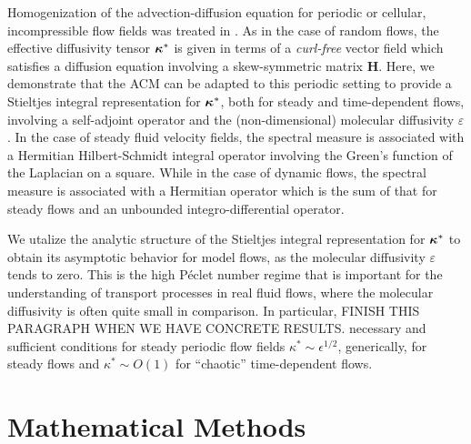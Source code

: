 \documentclass[11pt]{amsart}
\newcommand{\Hb}{\mathbf{H}}
\newcommand\bkappa{\mbox{\boldmath${\kappa}$}}
\begin{document}
Homogenization of the advection-diffusion equation for periodic or
cellular, incompressible flow fields was treated in
\cite{Fannjiang:SIAM_JAM:333,Fannjiang:1997:1033}. As in the case of
random flows, the effective diffusivity tensor
$\bkappa^*$ is given in terms of a \emph{curl-free} vector field which
satisfies a diffusion equation involving a skew-symmetric
matrix $\Hb$. Here, we demonstrate that the ACM can
be adapted to this periodic setting to provide a Stieltjes
integral representation for $\bkappa^*$, both for steady and
time-dependent flows, involving a self-adjoint operator and the
(non-dimensional) molecular diffusivity $\varepsilon$. In the case of steady
fluid velocity fields, the spectral measure is associated with a
Hermitian Hilbert-Schmidt integral operator involving the Green's
function of the Laplacian on a square. While in the case of dynamic
flows, the spectral measure is associated with a Hermitian operator
which is the sum of that for steady flows and an unbounded
integro-differential operator.     



We utalize the analytic structure of the Stieltjes integral
representation for $\bkappa^*$ to obtain its asymptotic behavior for
model flows, as the molecular diffusivity $\varepsilon$ tends to zero. This is
the high P\'{e}clet number regime that is important for the
understanding of transport processes in real fluid flows, where the
molecular diffusivity is often quite small in comparison. In
particular, FINISH THIS PARAGRAPH WHEN WE HAVE CONCRETE RESULTS.
necessary and sufficient conditions for steady periodic flow
fields $\kappa^*\sim\epsilon^{1/2}$, generically, for steady flows and $\kappa^*\sim O(1)$ for
``chaotic'' time-dependent flows. 

%
\section{Mathematical Methods}\label{sec:Mathematical_Methods} 
%
\end{document}
